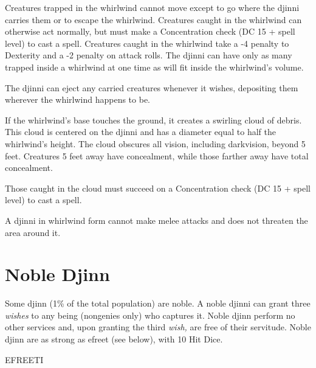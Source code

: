 \documentclass{article}
\begin{document}
Creatures trapped in the whirlwind cannot move except to go where the djinni carries 
them or to escape the whirlwind. Creatures caught in the whirlwind can otherwise 
act normally, but must make a Concentration check (DC 15 + spell level) to cast 
a spell. Creatures caught in the whirlwind take a -4 penalty to Dexterity and a 
-2 penalty on attack rolls. The djinni can have only as many trapped inside a whirlwind 
at one time as will fit inside the whirlwind's volume.

The djinni can eject any carried creatures whenever it wishes, depositing them 
wherever the whirlwind happens to be. 

If the whirlwind's base touches the ground, it creates a swirling cloud of debris. 
This cloud is centered on the djinni and has a diameter equal to half the whirlwind's 
height. The cloud obscures all vision, including darkvision, beyond 5 feet. Creatures 
5 feet away have concealment, while those farther away have total concealment.

Those caught in the cloud must succeed on a Concentration check (DC 15 + spell 
level) to cast a spell.

A djinni in whirlwind form cannot make melee attacks and does not threaten the 
area around it.

\section*{\textbf{Noble Djinn}}

Some djinn (1\% of the total population) are noble. A noble djinni can grant three 
\textit{wishes }to any being (nongenies only) who captures it. Noble djinn perform 
no other services and, upon granting the third \textit{wish, }are free of their 
servitude. Noble djinn are as strong as efreet (see below), with 10 Hit Dice.

EFREETI
\end{document}
